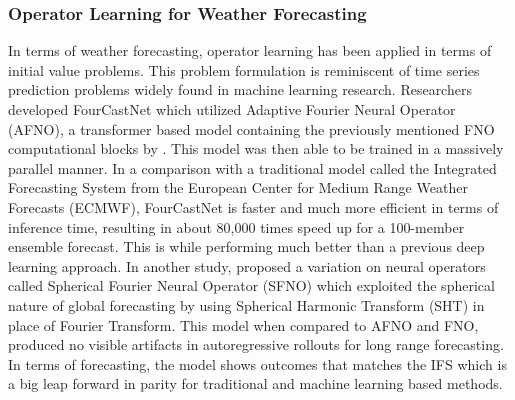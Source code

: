 \subsubsection*{Operator Learning for Weather Forecasting}
In terms of weather forecasting, operator learning has been applied in terms of initial value problems. This problem formulation is reminiscent of time series prediction problems widely found in machine learning research. Researchers \textcite{kurthFourCastNetAcceleratingGlobal2023} developed FourCastNet which utilized Adaptive Fourier Neural Operator (AFNO), a transformer based model containing the previously mentioned FNO computational blocks by \textcite{li2021fourier}. This model was then able to be trained in a massively parallel manner. In a comparison with a traditional model called the Integrated Forecasting System from the European Center for Medium Range Weather Forecasts (ECMWF), FourCastNet is faster and much more efficient in terms of inference time, resulting in about 80,000 times speed up for a 100-member ensemble forecast. This is while performing much better than a previous deep learning approach. In another study, \textcite{bonevSphericalFourierNeural2023} proposed a variation on neural operators called Spherical Fourier Neural Operator (SFNO) which exploited the spherical nature of global forecasting by using Spherical Harmonic Transform (SHT) in place of Fourier Transform. This model when compared to AFNO and FNO, produced no visible artifacts in autoregressive rollouts for long range forecasting. In terms of forecasting, the model shows outcomes that matches the IFS which is a big leap forward in parity for traditional and machine learning based methods.






